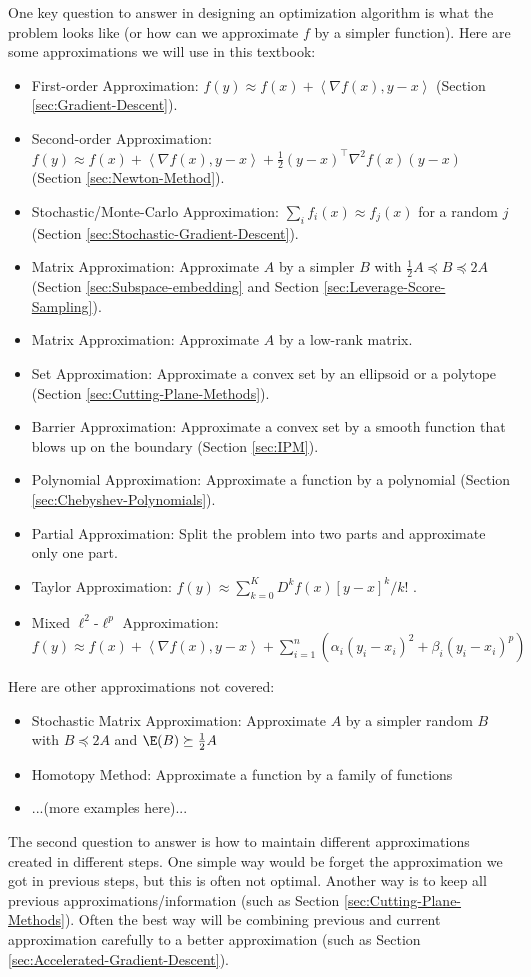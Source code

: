One key question to answer in designing an optimization algorithm
is what the problem looks like (or how can we approximate $f$ by
a simpler function). Here are some approximations we will use in this
textbook:
\begin{itemize}
\item First-order Approximation: $f(y)\approx f(x)+\left\langle \nabla f(x),y-x\right\rangle $
(Section \ref{sec:Gradient-Descent}).
\item Second-order Approximation: $f(y)\approx f(x)+\left\langle \nabla f(x),y-x\right\rangle +\frac{1}{2}(y-x)^{\top}\nabla^{2}f(x)(y-x)$
(Section \ref{sec:Newton-Method}).
\item Stochastic/Monte-Carlo Approximation: $\sum_{i}f_{i}(x)\approx f_{j}(x)$
for a random $j$ (Section \ref{sec:Stochastic-Gradient-Descent}).
\item Matrix Approximation: Approximate $A$ by a simpler $B$ with $\frac{1}{2}A\preceq B\preceq2A$
(Section \ref{sec:Subspace-embedding} and Section \ref{sec:Leverage-Score-Sampling}).
\item Matrix Approximation: Approximate $A$ by a low-rank matrix.
\item Set Approximation: Approximate a convex set by an ellipsoid or a polytope
(Section \ref{sec:Cutting-Plane-Methods}).
\item Barrier Approximation: Approximate a convex set by a smooth function
that blows up on the boundary (Section \ref{sec:IPM}).
\item Polynomial Approximation: Approximate a function by a polynomial (Section
\ref{sec:Chebyshev-Polynomials}).
\item Partial Approximation: Split the problem into two parts and approximate
only one part.
\item Taylor Approximation: $f(y)\approx\sum_{k=0}^{K}D^{k}f(x)[y-x]^{k}/k!$
.
\item Mixed $\ell^{2}$-$\ell^{p}$ Approximation: $f(y)\approx f(x)+\left\langle \nabla f(x),y-x\right\rangle +\sum_{i=1}^{n}(\alpha_{i}(y_{i}-x_{i})^{2}+\beta_{i}(y_{i}-x_{i})^{p})$
\end{itemize}
Here are other approximations not covered:
\begin{itemize}
\item Stochastic Matrix Approximation: Approximate $A$ by a simpler random
$B$ with $B\preceq2A$ and $\E(B)\succeq\frac{1}{2}A$ 
\item Homotopy Method: Approximate a function by a family of functions 
\item ...(more examples here)...
\end{itemize}
The second question to answer is how to maintain different approximations
created in different steps. One simple way would be forget the approximation
we got in previous steps, but this is often not optimal. Another way
is to keep all previous approximations/information (such as Section
\ref{sec:Cutting-Plane-Methods}). Often the best way will be combining
previous and current approximation carefully to a better approximation
(such as Section \ref{sec:Accelerated-Gradient-Descent}).

